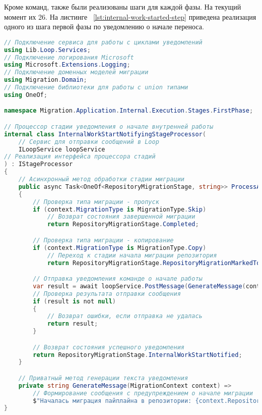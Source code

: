 Кроме команд, также были реализованы шаги для каждой фазы.
На текущий момент их 26.
На листинге ~\ref{lst:internal-work-started-step} приведена реализация одного из шага первой фазы по уведомлению о начале переноса.

\begin{lstlisting}[language=c#,label={lst:internal-work-started-step},caption={Код шага оповещения о старте начала работ}]
// Подключение сервиса для работы с циклами уведомлений
using Lib.Loop.Services;
// Подключение логирования Microsoft
using Microsoft.Extensions.Logging;
// Подключение доменных моделей миграции
using Migration.Domain;
// Подключение библиотеки для работы с union типами
using OneOf;

namespace Migration.Application.Internal.Execution.Stages.FirstPhase;

// Процессор стадии уведомления о начале внутренней работы
internal class InternalWorkStartNotifyingStageProcessor(
    // Сервис для отправки сообщений в Loop
    ILoopService loopService
// Реализация интерфейса процессора стадий
) : IStageProcessor
{
    // Асинхронный метод обработки стадии миграции
    public async Task<OneOf<RepositoryMigrationStage, string>> ProcessAsync(MigrationContext context, ILogger logger)
    {
        // Проверка типа миграции - пропуск
        if (context.MigrationType is MigrationType.Skip)
            // Возврат состояния завершенной миграции
            return RepositoryMigrationStage.Completed;

        // Проверка типа миграции - копирование
        if (context.MigrationType is MigrationType.Copy)
            // Переход к стадии начала миграции репозитория
            return RepositoryMigrationStage.RepositoryMigrationMarkedToStart;

        // Отправка уведомления команде о начале работы
        var result = await loopService.PostMessage(GenerateMessage(context), context.Team);
        // Проверка результата отправки сообщения
        if (result is not null)
        {
            // Возврат ошибки, если отправка не удалась
            return result;
        }

        // Возврат состояния успешного уведомления
        return RepositoryMigrationStage.InternalWorkStartNotified;
    }

    // Приватный метод генерации текста уведомления
    private string GenerateMessage(MigrationContext context) =>
        // Формирование сообщения с предупреждением о начале миграции
        $"Началась миграция пайплайна в репозитории: {context.RepositoryName}. ** Пожалуйста, не меняйте его Workflow ** ";
}
\end{lstlisting}

